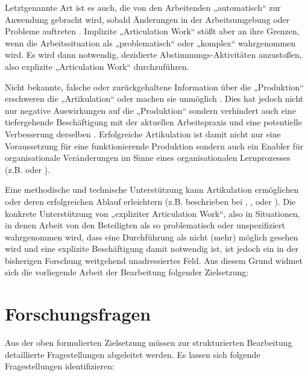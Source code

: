 Letztgenannte Art ist es auch, die von den Arbeitenden „automatisch“ zur Anwendung gebracht wird, sobald Änderungen in der Arbeitsumgebung oder Probleme auftreten \citep{Strauss88}. Implizite „Articulation Work“ stößt aber an ihre Grenzen, wenn die Arbeitssituation als „problematisch“ \citep{Strauss88} oder „komplex“ \citep[][S. 23f]{Schmidt90} wahrgenommen wird. Es wird dann notwendig, dezidierte Abstimmungs-Aktivitäten anzustoßen, also explizite „Articulation Work“ durchzuführen.

Nicht bekannte, falsche oder zurückgehaltene Information über die „Produktion“ erschweren die „Artikulation“ oder machen sie unmöglich \citep{Fujimura87}. Dies hat jedoch nicht nur negative Auswirkungen auf die „Produktion“ sondern verhindert auch eine tiefergehende Beschäftigung mit der aktuellen Arbeitspraxis und eine potentielle Verbesserung derselben \citep{Argyris78}. Erfolgreiche Artikulation ist damit nicht nur eine Voraussetzung für eine funktionierende Produktion sondern auch ein Enabler für organisationale Veränderungen im Sinne eines organisationalen Lernprozesses (z.B. \citep{Kim93} oder \citep{Firestone03a}).

Eine methodische und technische Unterstützung kann Artikulation ermöglichen oder deren erfolgreichen Ablauf erleichtern (z.B. beschrieben bei \citet{Schmidt92}, \citet{Simone99}, \citet{Jorgensen04} oder \citet{Baker07}). Die konkrete Unterstützung von „expliziter Articulation Work“, also in Situationen, in denen Arbeit von den Beteiligten als so problematisch oder unspezifiziert wahrgenommen wird, dass eine Durchführung als nicht (mehr) möglich gesehen wird und eine explizite Beschäftigung damit notwendig ist, ist jedoch ein in der bisherigen Forschung weitgehend unadressiertes Feld. Aus diesem Grund widmet sich die vorliegende Arbeit der Bearbeitung folgender Zielsetzung: 


\section{Forschungsfragen} %
\label{sec:forschungsfragen}

Aus der oben formulierten Zielsetzung müssen zur strukturierten Bearbeitung detaillierte Fragestellungen abgeleitet werden. Es lassen sich folgende Fragestellungen identifizieren:

